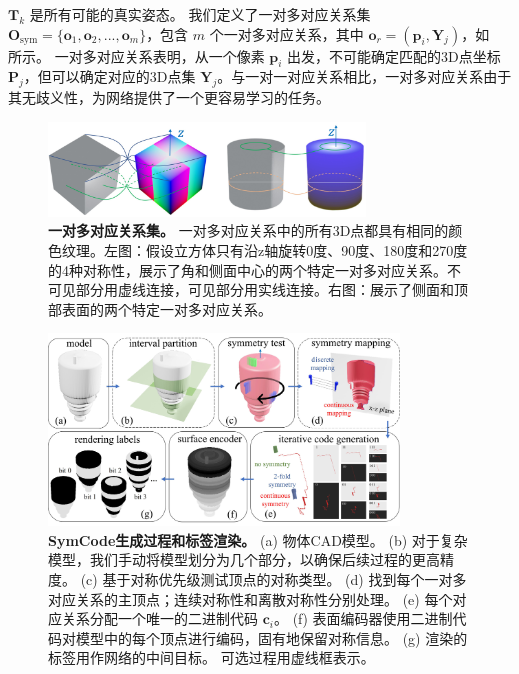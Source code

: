 $\mathbf{T}_k$ 是所有可能的真实姿态。
我们定义了一对多对应关系集 $\mathbf{O}_\text{sym} = \{\mathbf{o}_1, \mathbf{o}_2, ..., \mathbf{o}_m\}$，包含 $m$ 个一对多对应关系，其中 $\mathbf{o}_r = (\mathbf{p}_i, \mathbf{Y}_j)$，如~ 所示。
一对多对应关系表明，从一个像素 $\mathbf{p}_i$ 出发，不可能确定匹配的3D点坐标 $\mathbf{P}_j$，但可以确定对应的3D点集 $\mathbf{Y}_j$。与一对一对应关系相比，一对多对应关系由于其无歧义性，为网络提供了一个更容易学习的任务。

\begin{figure}[ht]
\centerline{\includegraphics[width=0.75\textwidth]{figure/symnet/one-to-many-correspondence.jpg}}
\caption{\textbf{一对多对应关系集。} 一对多对应关系中的所有3D点都具有相同的颜色纹理。左图：假设立方体只有沿z轴旋转0度、90度、180度和270度的4种对称性，展示了角和侧面中心的两个特定一对多对应关系。不可见部分用虚线连接，可见部分用实线连接。右图：展示了侧面和顶部表面的两个特定一对多对应关系。}
\label{fig:many_many_corres}
\end{figure}

\begin{figure}[ht]
    \centerline{\includegraphics[width=0.83\textwidth]{figure/symnet/process_of_model.jpg}}
        \caption{\textbf{SymCode生成过程和标签渲染。} (a) 物体CAD模型。 (b) 对于复杂模型，我们手动将模型划分为几个部分，以确保后续过程的更高精度。 (c) 基于对称优先级测试顶点的对称类型。 (d) 找到每个一对多对应关系的主顶点；连续对称性和离散对称性分别处理。 (e) 每个对应关系分配一个唯一的二进制代码 $\mathbf{c}_i$。 (f) 表面编码器使用二进制代码对模型中的每个顶点进行编码，固有地保留对称信息。 (g) 渲染的标签用作网络的中间目标。 可选过程用虚线框表示。}
        \label{process_of_model}
\end{figure}

